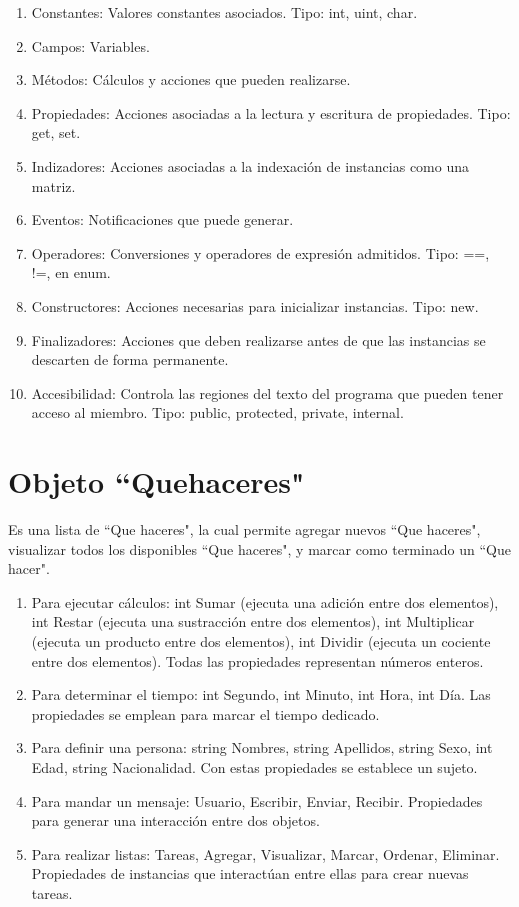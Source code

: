 \documentclass[10pt,a4paper]{article}
\begin{document}
	\begin{enumerate}
\item{Constantes: Valores constantes asociados. Tipo: int, uint, char.}
\item{Campos: Variables.}
\item{Métodos: Cálculos y acciones que pueden realizarse.}
\item{Propiedades: Acciones asociadas a la lectura y escritura de propiedades. Tipo: get, set.}
\item{Indizadores: Acciones asociadas a la indexación de instancias como una matriz.}
\item{Eventos: Notificaciones que puede generar.}
\item{Operadores: Conversiones y operadores de expresión admitidos. Tipo: ==, !=, en enum.}
\item{Constructores: Acciones necesarias para inicializar instancias. Tipo: new.}
\item{Finalizadores: Acciones que deben realizarse antes de que las instancias se descarten de forma permanente.}
\item{Accesibilidad: Controla las regiones del texto del programa que pueden tener acceso al miembro. Tipo: public, protected, private, internal.}
    \end{enumerate}
    
	\section*{Objeto ``Quehaceres"}
	
Es una lista de ``Que haceres", la cual permite agregar nuevos ``Que haceres", visualizar todos los disponibles ``Que haceres", y marcar como terminado un ``Que hacer".

	\begin{enumerate}
\item{Para ejecutar cálculos: int Sumar (ejecuta una adición entre dos elementos), int Restar (ejecuta una sustracción entre dos elementos), int Multiplicar (ejecuta un producto entre dos elementos), int Dividir (ejecuta un cociente entre dos elementos). Todas las propiedades representan números enteros.}
\item{Para determinar el tiempo: int Segundo, int Minuto, int Hora, int Día. Las propiedades se emplean para marcar el tiempo dedicado.}
\item{Para definir una persona: string Nombres, string Apellidos, string Sexo, int Edad, string Nacionalidad. Con estas propiedades se establece un sujeto.}
\item{Para mandar un mensaje: Usuario, Escribir, Enviar, Recibir. Propiedades para generar una interacción entre dos objetos.}
\item{Para realizar listas: Tareas, Agregar, Visualizar, Marcar, Ordenar, Eliminar. Propiedades de instancias que interactúan entre ellas para crear nuevas tareas.}
    \end{enumerate}
	
\end{document}
